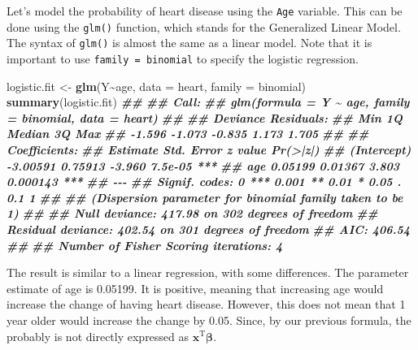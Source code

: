 \documentclass[
]{book}
\newenvironment{Shaded}{\begin{snugshade}}{\end{snugshade}}
\newcommand{\AttributeTok}[1]{\textcolor[rgb]{0.13,0.29,0.53}{#1}}
\newcommand{\DocumentationTok}[1]{\textcolor[rgb]{0.56,0.35,0.01}{\textbf{\textit{#1}}}}
\newcommand{\FunctionTok}[1]{\textcolor[rgb]{0.13,0.29,0.53}{\textbf{#1}}}
\newcommand{\NormalTok}[1]{#1}
\newcommand{\OtherTok}[1]{\textcolor[rgb]{0.56,0.35,0.01}{#1}}
\newcommand{\SpecialCharTok}[1]{\textcolor[rgb]{0.81,0.36,0.00}{\textbf{#1}}}
\theoremstyle{definition}
\theoremstyle{definition}
\theoremstyle{definition}
\theoremstyle{definition}
\theoremstyle{remark}
\begin{document}
Let's model the probability of heart disease using the \texttt{Age} variable. This can be done using the \texttt{glm()} function, which stands for the Generalized Linear Model. The syntax of \texttt{glm()} is almost the same as a linear model. Note that it is important to use \texttt{family\ =\ binomial} to specify the logistic regression.

\begin{Shaded}
\begin{Highlighting}[]
\NormalTok{  logistic.fit }\OtherTok{\textless{}{-}} \FunctionTok{glm}\NormalTok{(Y}\SpecialCharTok{\textasciitilde{}}\NormalTok{age, }\AttributeTok{data =}\NormalTok{ heart, }\AttributeTok{family =}\NormalTok{ binomial)}
  \FunctionTok{summary}\NormalTok{(logistic.fit)}
\DocumentationTok{\#\# }
\DocumentationTok{\#\# Call:}
\DocumentationTok{\#\# glm(formula = Y \textasciitilde{} age, family = binomial, data = heart)}
\DocumentationTok{\#\# }
\DocumentationTok{\#\# Deviance Residuals: }
\DocumentationTok{\#\#    Min      1Q  Median      3Q     Max  }
\DocumentationTok{\#\# {-}1.596  {-}1.073  {-}0.835   1.173   1.705  }
\DocumentationTok{\#\# }
\DocumentationTok{\#\# Coefficients:}
\DocumentationTok{\#\#             Estimate Std. Error z value Pr(\textgreater{}|z|)    }
\DocumentationTok{\#\# (Intercept) {-}3.00591    0.75913  {-}3.960  7.5e{-}05 ***}
\DocumentationTok{\#\# age          0.05199    0.01367   3.803 0.000143 ***}
\DocumentationTok{\#\# {-}{-}{-}}
\DocumentationTok{\#\# Signif. codes:  0 \textquotesingle{}***\textquotesingle{} 0.001 \textquotesingle{}**\textquotesingle{} 0.01 \textquotesingle{}*\textquotesingle{} 0.05 \textquotesingle{}.\textquotesingle{} 0.1 \textquotesingle{} \textquotesingle{} 1}
\DocumentationTok{\#\# }
\DocumentationTok{\#\# (Dispersion parameter for binomial family taken to be 1)}
\DocumentationTok{\#\# }
\DocumentationTok{\#\#     Null deviance: 417.98  on 302  degrees of freedom}
\DocumentationTok{\#\# Residual deviance: 402.54  on 301  degrees of freedom}
\DocumentationTok{\#\# AIC: 406.54}
\DocumentationTok{\#\# }
\DocumentationTok{\#\# Number of Fisher Scoring iterations: 4}
\end{Highlighting}
\end{Shaded}

The result is similar to a linear regression, with some differences. The parameter estimate of age is 0.05199. It is positive, meaning that increasing age would increase the change of having heart disease. However, this does not mean that 1 year older would increase the change by 0.05. Since, by our previous formula, the probably is not directly expressed as \(\mathbf{x}^\text{T}\boldsymbol \beta\).
\end{document}
